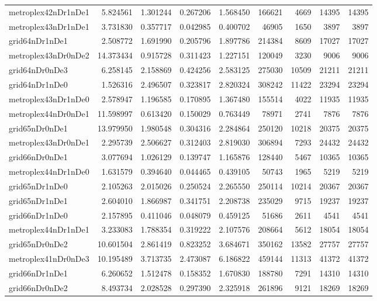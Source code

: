 \documentclass[../../../thesis.tex]{subfiles}
\begin{document}
\begin{longtable}{|l|r|r|r|r|r|r|r|r|}
metroplex42nDr1nDe1 & 5.824561 & 1.301244 & 0.267206 & 1.568450 & 166621 & 4669 & 14395 & 14395 \\
metroplex43nDr1nDe1 & 3.731830 & 0.357717 & 0.042985 & 0.400702 & 46905 & 1650 & 3897 & 3897 \\
grid64nDr1nDe1 & 2.508772 & 1.691990 & 0.205796 & 1.897786 & 214384 & 8609 & 17027 & 17027 \\
metroplex43nDr0nDe2 & 14.373434 & 0.915728 & 0.311423 & 1.227151 & 120049 & 3230 & 9006 & 9006 \\
grid64nDr0nDe3 & 6.258145 & 2.158869 & 0.424256 & 2.583125 & 275030 & 10509 & 21211 & 21211 \\
grid64nDr1nDe0 & 1.526316 & 2.496507 & 0.323817 & 2.820324 & 308242 & 11422 & 23294 & 23294 \\
metroplex43nDr1nDe0 & 2.578947 & 1.196585 & 0.170895 & 1.367480 & 155514 & 4022 & 11935 & 11935 \\
metroplex44nDr0nDe1 & 11.598997 & 0.613420 & 0.150029 & 0.763449 & 78971 & 2741 & 7876 & 7876 \\
grid65nDr0nDe1 & 13.979950 & 1.980548 & 0.304316 & 2.284864 & 250120 & 10218 & 20375 & 20375 \\
metroplex43nDr0nDe1 & 2.295739 & 2.506627 & 0.312403 & 2.819030 & 306894 & 7293 & 24432 & 24432 \\
grid66nDr0nDe1 & 3.077694 & 1.026129 & 0.139747 & 1.165876 & 128440 & 5467 & 10365 & 10365 \\
metroplex44nDr1nDe0 & 1.631579 & 0.394640 & 0.044465 & 0.439105 & 50743 & 1965 & 5219 & 5219 \\
grid65nDr1nDe0 & 2.105263 & 2.015026 & 0.250524 & 2.265550 & 250114 & 10214 & 20367 & 20367 \\
grid65nDr1nDe1 & 2.604010 & 1.866987 & 0.341751 & 2.208738 & 235029 & 9715 & 19237 & 19237 \\
grid66nDr1nDe0 & 2.157895 & 0.411046 & 0.048079 & 0.459125 & 51686 & 2611 & 4541 & 4541 \\
metroplex44nDr1nDe1 & 3.233083 & 1.788354 & 0.319222 & 2.107576 & 208664 & 5612 & 18054 & 18054 \\
grid65nDr0nDe2 & 10.601504 & 2.861419 & 0.823252 & 3.684671 & 350162 & 13582 & 27757 & 27757 \\
metroplex41nDr0nDe3 & 10.195489 & 3.713735 & 2.473087 & 6.186822 & 459144 & 11313 & 41372 & 41372 \\
grid66nDr1nDe1 & 6.260652 & 1.512478 & 0.158352 & 1.670830 & 188780 & 7291 & 14310 & 14310 \\
grid66nDr0nDe2 & 8.493734 & 2.028528 & 0.297390 & 2.325918 & 261896 & 9121 & 18269 & 18269 \\

\end{longtable}
\end{document}
